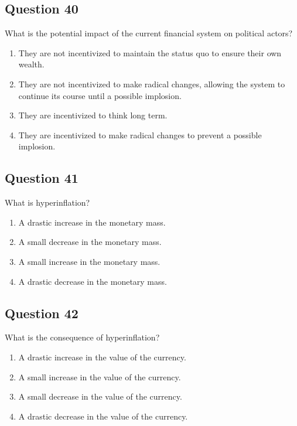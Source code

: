 \documentclass[12pt,a4paper]{article}
\begin{document}
\subsection*{Question 40}
What is the potential impact of the current financial system on political actors?

\begin{enumerate}[label=\Alph*., leftmargin=*]
\item They are not incentivized to maintain the status quo to ensure their own wealth.
\item They are not incentivized to make radical changes, allowing the system to continue its course until a possible implosion.
\item They are incentivized to think long term.
\item They are incentivized to make radical changes to prevent a possible implosion.
\end{enumerate}

\bigskip


\subsection*{Question 41}
What is hyperinflation?

\begin{enumerate}[label=\Alph*., leftmargin=*]
\item A drastic increase in the monetary mass.
\item A small decrease in the monetary mass.
\item A small increase in the monetary mass.
\item A drastic decrease in the monetary mass.
\end{enumerate}

\bigskip


\subsection*{Question 42}
What is the consequence of hyperinflation?

\begin{enumerate}[label=\Alph*., leftmargin=*]
\item A drastic increase in the value of the currency.
\item A small increase in the value of the currency.
\item A small decrease in the value of the currency.
\item A drastic decrease in the value of the currency.
\end{enumerate}
\end{document}
